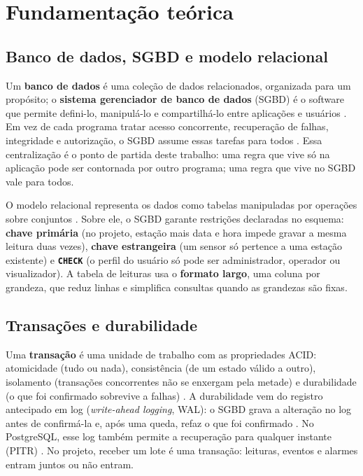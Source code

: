 \chapter{Fundamentação teórica}\label{cap:fundamentacao}

\section{Banco de dados, SGBD e modelo relacional}

Um \textbf{banco de dados} é uma coleção de dados relacionados, organizada para um propósito; o \textbf{sistema gerenciador de banco de dados} (SGBD) é o software que permite defini-lo, manipulá-lo e compartilhá-lo entre aplicações e usuários \parencite{elmasri2018}. Em vez de cada programa tratar acesso concorrente, recuperação de falhas, integridade e autorização, o SGBD assume essas tarefas para todos \parencite{silberschatz2020}. Essa centralização é o ponto de partida deste trabalho: uma regra que vive só na aplicação pode ser contornada por outro programa; uma regra que vive no SGBD vale para todos.

O modelo relacional representa os dados como tabelas manipuladas por operações sobre conjuntos \parencite{codd1970}. Sobre ele, o SGBD garante restrições declaradas no esquema: \textbf{chave primária} (no projeto, estação mais data e hora impede gravar a mesma leitura duas vezes), \textbf{chave estrangeira} (um sensor só pertence a uma estação existente) e \textbf{\texttt{CHECK}} (o perfil do usuário só pode ser administrador, operador ou visualizador). A tabela de leituras usa o \textbf{formato largo}, uma coluna por grandeza, que reduz linhas e simplifica consultas quando as grandezas são fixas.

\section{Transações e durabilidade}

Uma \textbf{transação} é uma unidade de trabalho com as propriedades ACID: atomicidade (tudo ou nada), consistência (de um estado válido a outro), isolamento (transações concorrentes não se enxergam pela metade) e durabilidade (o que foi confirmado sobrevive a falhas) \parencite{harder1983}. A durabilidade vem do registro antecipado em log (\textit{write-ahead logging}, WAL): o SGBD grava a alteração no log antes de confirmá-la e, após uma queda, refaz o que foi confirmado \parencite{mohan1992}. No PostgreSQL, esse log também permite a recuperação para qualquer instante (PITR) \parencite{pgbackup}. No projeto, receber um lote é uma transação: leituras, eventos e alarmes entram juntos ou não entram.

